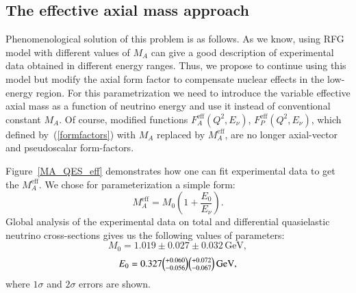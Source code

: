 \subsection{The effective axial mass approach}
Phenomenological solution of this problem is as follows. As we know, using RFG model with different values of $M_{A}$ can give a good description of experimental data obtained in different energy ranges. Thus, we propose to continue using this model but modify the axial form factor to compensate nuclear effects in the low-energy region. For this parametrization we need to introduce the variable effective axial mass as a function of neutrino energy and use it instead of conventional constant $M_{A}$. Of course, modified functions $F_{A}^\mathrm{eff}(Q^{2},E_{\nu})$, $F_{P}^\mathrm{eff}(Q^{2},E_{\nu})$, which defined by~(\ref{formfactors}) with $M_{A}$ replaced by $M_{A}^\mathrm{eff}$, are no longer axial-vector and pseudoscalar form-factors.

Figure~\ref{MA_QES_eff} demonstrates how one can fit experimental data to get the $M_{A}^\mathrm{eff}$. We chose for parameterization a simple form:
\begin{equation}
M_{A}^\mathrm{eff}=M_{0}\left(1+\frac{E_{0}}{E_{\nu}}\right).
\end{equation}
Global analysis of the experimental data on total and differential quasielastic neutrino cross-sections gives us the following values of parameters:
\begin{equation}
M_{0}=1.019\pm0.027\pm0.032\,\mathrm{GeV},
\end{equation}
\begin{equation}
E_{0}=0.327\tbinom{+0.060}{-0.056}\tbinom{+0.072}{-0.067}\,\mathrm{GeV},
\end{equation}
where $1\sigma$ and $2\sigma$ errors are shown.


